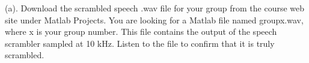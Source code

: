 (a). Download the scrambled speech .wav file for your group from the course web site under Matlab Projects. You are looking for a Matlab file named groupx.wav, where x is your group number. This file contains the output of the speech scrambler sampled at 10 kHz. Listen to the file to confirm that it is truly scrambled.
